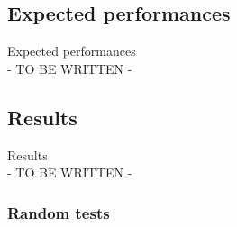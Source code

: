 \documentclass[11pt]{article}
\begin{document}
        \subsection{Expected performances} \label{subsec:expected_performances}

            Expected performances \\
            - TO BE WRITTEN -

        \subsection{Results} \label{subsec:results}

            Results \\
            - TO BE WRITTEN -

            \subsubsection{Random tests} \label{subsubsec:tests_1}
\end{document}
